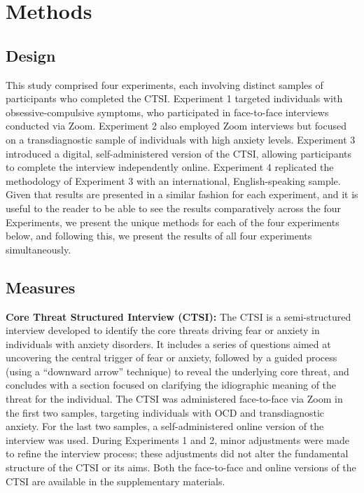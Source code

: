 \documentclass[
  man,floatsintext]{apa7}
\begin{document}
\section{Methods}\label{methods}

\subsection{Design}\label{design}

This study comprised four experiments, each involving distinct samples of participants who completed the CTSI.
Experiment 1 targeted individuals with obsessive-compulsive symptoms, who participated in face-to-face interviews conducted via Zoom.
Experiment 2 also employed Zoom interviews but focused on a transdiagnostic sample of individuals with high anxiety levels.
Experiment 3 introduced a digital, self-administered version of the CTSI, allowing participants to complete the interview independently online.
Experiment 4 replicated the methodology of Experiment 3 with an international, English-speaking sample.
Given that results are presented in a similar fashion for each experiment, and it is useful to the reader to be able to see the results comparatively across the four Experiments, we present the unique methods for each of the four experiments below, and following this, we present the results of all four experiments simultaneously.

\subsection{Measures}\label{measures}

\textbf{Core Threat Structured Interview (CTSI):} The CTSI is a semi-structured interview developed to identify the core threats driving fear or anxiety in individuals with anxiety disorders.
It includes a series of questions aimed at uncovering the central trigger of fear or anxiety, followed by a guided process (using a ``downward arrow'' technique) to reveal the underlying core threat, and concludes with a section focused on clarifying the idiographic meaning of the threat for the individual.
The CTSI was administered face-to-face via Zoom in the first two samples, targeting individuals with OCD and transdiagnostic anxiety.
For the last two samples, a self-administered online version of the interview was used.
During Experiments 1 and 2, minor adjustments were made to refine the interview process; these adjustments did not alter the fundamental structure of the CTSI or its aims.
Both the face-to-face and online versions of the CTSI are available in the supplementary materials.
\end{document}
